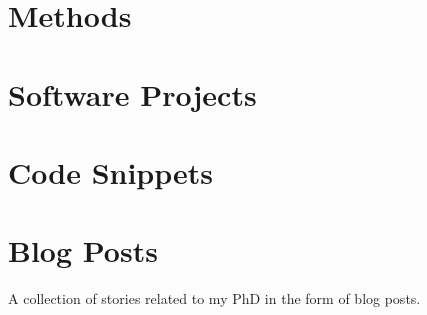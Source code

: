 \documentclass[12pt, a4paper]{report}
\begin{document}
\chapter{Methods} \label{sec:Methods}







{
  \sloppy
  \printbibliography[title={Literature Cited}]{}
}

\begin{appendices}
  \chapter{Software Projects} \label{sec:software_projects}
  
  \chapter{Code Snippets} \label{sec:code_snippets}
  
  \chapter{Blog Posts} \label{sec:blog_posts}
  A collection of stories related to my PhD in the form of blog posts.

  
  
  
  
  
  
  
  
  

\end{appendices}
\end{document}
